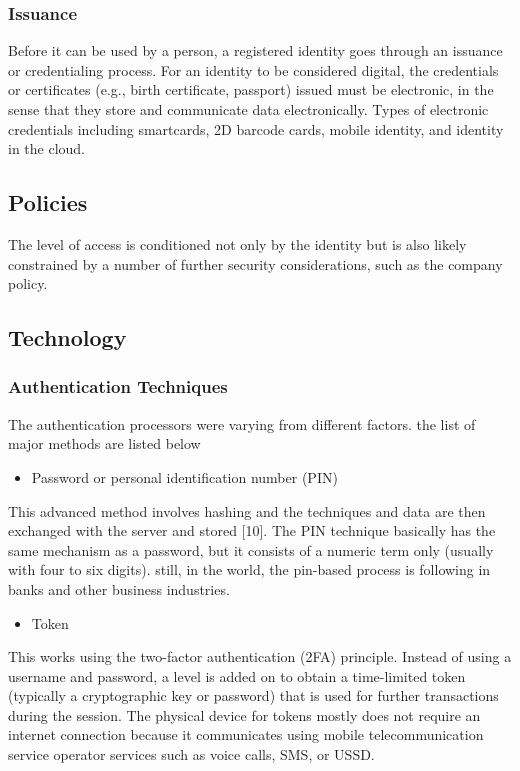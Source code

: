   \subsubsection{Issuance}
  Before it can be used by a person, a registered identity goes through an issuance or credentialing process. For an identity to be considered digital, the credentials or certificates (e.g., birth certificate, passport) issued must be electronic, in the sense that they store and communicate data electronically. Types of electronic credentials including smartcards, 2D barcode cards, mobile identity, and identity in the cloud.

  \subsection{Policies}
  The level of access is conditioned not only by the identity but is also likely constrained by a number of further security considerations, such as the company policy.
  
  \subsection{Technology}
  \subsubsection{Authentication Techniques}
  The authentication processors were varying from different factors. the list of major methods are listed below

  \begin{itemize}
      \item Password or personal identification number (PIN)
  \end{itemize}

  This advanced method involves hashing and the techniques and data are then exchanged with the server and stored [10]. The PIN technique basically has the same mechanism as a password, but it consists of a numeric term only (usually with four to six digits). still, in the world, the pin-based process is following in banks and other business industries. 

  \begin{itemize}
    \item Token
\end{itemize}
  
This works using the two-factor authentication (2FA) principle. Instead of using a username and password, a level is added on to obtain a time-limited token (typically a cryptographic key or password) that is used for further transactions during the session. The physical device for tokens mostly does not require an internet connection because it communicates using mobile telecommunication service operator services such as voice calls, SMS, or USSD. 

